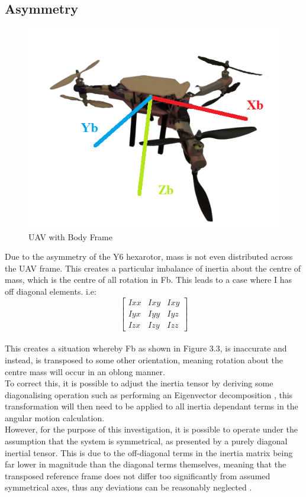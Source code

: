 \documentclass[12pt,a4paper,twoside]{report}
\begin{document}
				\subsection{Asymmetry}
					
					\begin{figure}[h!]
						\centering
						\includegraphics[width=0.6\linewidth]{UAVBodyFrame.png}
						\caption{UAV with Body Frame}
						\label{fig:uavbodyframe}
					\end{figure}
						
					Due to the asymmetry of the Y6 hexarotor, mass is not even distributed across the UAV frame. This creates a particular imbalance of inertia about the centre of mass, which is the centre of all rotation in Fb. This leads to a case where I has off diagonal elements\cite{10}. i.e:
					\\
					$$ 
					\begin{bmatrix}
						Ixx & Ixy & Ixy \\
						Iyx & Iyy & Iyz \\
						Izx & Izy & Izz
					\end{bmatrix}
					$$
					\\
					This creates a situation whereby Fb as shown in Figure 3.3, is inaccurate and instead, is transposed to some other orientation, meaning rotation about the centre mass will occur in an oblong manner.
					\\
					To correct this, it is possible to adjust the inertia tensor by deriving some diagonalising operation such as performing an Eigenvector decomposition \cite{10}, this transformation will then need to be applied to all inertia dependant terms in the angular motion calculation.
					\\  
					However, for the purpose of this investigation, it is possible to operate under the assumption that the system is symmetrical, as presented by a purely diagonal inertial tensor. This is due to the off-diagonal terms in the inertia matrix being far lower in magnitude than the diagonal terms themselves, meaning that the transposed reference frame does not differ too significantly from assumed symmetrical axes, thus any deviations can be reasonably neglected \cite{10}.
			
\end{document}
